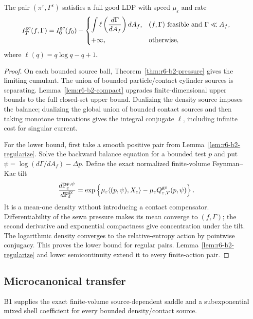 \begin{theorem}
\label{thm:r6-b2-gc-ldp}
The pair \((\pi^\varepsilon,\Gamma^\varepsilon)\) satisfies a full good LDP
with speed \(\mu_\varepsilon\) and rate
\[
I_T^{\rm gc}(f,\Gamma)=I_0^{\rm gc}(f_0)+
\begin{cases}
\displaystyle\int\ell\left(\frac{d\Gamma}{dA_f}\right)dA_f,
&(f,\Gamma)\text{ feasible and }\Gamma\ll A_f,\\[2ex]
+\infty,&\text{otherwise},
\end{cases}
\]
where \(\ell(q)=q\log q-q+1\).
\end{theorem}

\begin{proof}
On each bounded source ball, Theorem~\ref{thm:r6-b2-pressure} gives the
limiting cumulant.  The union of bounded particle/contact cylinder sources is
separating.  Lemma~\ref{lem:r6-b2-compact} upgrades finite-dimensional upper
bounds to the full closed-set upper bound.  Dualizing the density source
imposes the balance; dualizing the global union of bounded contact sources and
then taking monotone truncations gives the integral conjugate \(\ell\),
including infinite cost for singular current.

For the lower bound, first take a smooth positive pair from
Lemma~\ref{lem:r6-b2-regularize}.  Solve the backward balance equation for a
bounded test \(p\) and put
\(\psi=\log(d\Gamma/dA_f)-\Delta p\).  Define the exact normalized
finite-volume Feynman--Kac tilt
\[
\frac{d\mathbb P_\varepsilon^{p,\psi}}
{d\mathbb P_\varepsilon^{\rm gc}}
=\exp\left\{
\mu_\varepsilon\langle(p,\psi),X_\varepsilon\rangle
-\mu_\varepsilon Q_{\varepsilon,T}^{\rm gc}(p,\psi)
\right\}.
\]
It is a mean-one density without introducing a contact compensator.
Differentiability of the sewn pressure makes its mean converge to
\((f,\Gamma)\); the second derivative and exponential compactness give
concentration under the tilt.  The logarithmic density converges to the
relative-entropy action by pointwise conjugacy.  This proves the lower bound
for regular pairs.  Lemma~\ref{lem:r6-b2-regularize} and lower semicontinuity
extend it to every finite-action pair.
\end{proof}

\subsection{Microcanonical transfer}

B1 supplies the exact finite-volume source-dependent saddle and a
subexponential mixed shell coefficient for every bounded density/contact
source.

